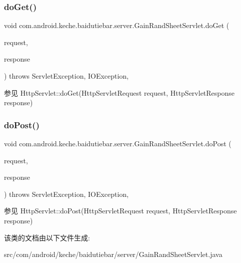 \subsubsection{\texorpdfstring{do\+Get()}{doGet()}}
{\footnotesize\ttfamily void com.\+android.\+keche.\+baidutiebar.\+server.\+Gain\+Rand\+Sheet\+Servlet.\+do\+Get (\begin{DoxyParamCaption}\item[{Http\+Servlet\+Request}]{request,  }\item[{Http\+Servlet\+Response}]{response }\end{DoxyParamCaption}) throws Servlet\+Exception, I\+O\+Exception\hspace{0.3cm}{\ttfamily [inline]}, {\ttfamily [protected]}}

\begin{DoxySeeAlso}{参见}
Http\+Servlet\+::do\+Get(\+Http\+Servlet\+Request request, Http\+Servlet\+Response response) 
\end{DoxySeeAlso}
\mbox{\label{classcom_1_1android_1_1keche_1_1baidutiebar_1_1server_1_1_gain_rand_sheet_servlet_accb367e2c96ba8ff2c86df33780d324b}} 
\subsubsection{\texorpdfstring{do\+Post()}{doPost()}}
{\footnotesize\ttfamily void com.\+android.\+keche.\+baidutiebar.\+server.\+Gain\+Rand\+Sheet\+Servlet.\+do\+Post (\begin{DoxyParamCaption}\item[{Http\+Servlet\+Request}]{request,  }\item[{Http\+Servlet\+Response}]{response }\end{DoxyParamCaption}) throws Servlet\+Exception, I\+O\+Exception\hspace{0.3cm}{\ttfamily [inline]}, {\ttfamily [protected]}}

\begin{DoxySeeAlso}{参见}
Http\+Servlet\+::do\+Post(\+Http\+Servlet\+Request request, Http\+Servlet\+Response response) 
\end{DoxySeeAlso}


该类的文档由以下文件生成\+:\begin{DoxyCompactItemize}
\item 
src/com/android/keche/baidutiebar/server/Gain\+Rand\+Sheet\+Servlet.\+java\end{DoxyCompactItemize}
